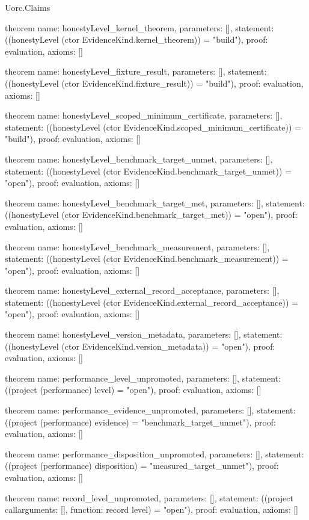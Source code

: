 \begin{lexlean}{Uorc.Claims}
\begin{semanticmodule}
theorem{
  name: honestyLevel_kernel_theorem,
  parameters: [],
  statement: ((honestyLevel (ctor EvidenceKind.kernel_theorem)) = "build"),
  proof: evaluation{},
  axioms: []
}

theorem{
  name: honestyLevel_fixture_result,
  parameters: [],
  statement: ((honestyLevel (ctor EvidenceKind.fixture_result)) = "build"),
  proof: evaluation{},
  axioms: []
}

theorem{
  name: honestyLevel_scoped_minimum_certificate,
  parameters: [],
  statement: ((honestyLevel (ctor EvidenceKind.scoped_minimum_certificate)) = "build"),
  proof: evaluation{},
  axioms: []
}

theorem{
  name: honestyLevel_benchmark_target_unmet,
  parameters: [],
  statement: ((honestyLevel (ctor EvidenceKind.benchmark_target_unmet)) = "open"),
  proof: evaluation{},
  axioms: []
}

theorem{
  name: honestyLevel_benchmark_target_met,
  parameters: [],
  statement: ((honestyLevel (ctor EvidenceKind.benchmark_target_met)) = "open"),
  proof: evaluation{},
  axioms: []
}

theorem{
  name: honestyLevel_benchmark_measurement,
  parameters: [],
  statement: ((honestyLevel (ctor EvidenceKind.benchmark_measurement)) = "open"),
  proof: evaluation{},
  axioms: []
}

theorem{
  name: honestyLevel_external_record_acceptance,
  parameters: [],
  statement: ((honestyLevel (ctor EvidenceKind.external_record_acceptance)) = "open"),
  proof: evaluation{},
  axioms: []
}

theorem{
  name: honestyLevel_version_metadata,
  parameters: [],
  statement: ((honestyLevel (ctor EvidenceKind.version_metadata)) = "open"),
  proof: evaluation{},
  axioms: []
}

theorem{
  name: performance_level_unpromoted,
  parameters: [],
  statement: ((project (performance) level) = "open"),
  proof: evaluation{},
  axioms: []
}

theorem{
  name: performance_evidence_unpromoted,
  parameters: [],
  statement: ((project (performance) evidence) = "benchmark_target_unmet"),
  proof: evaluation{},
  axioms: []
}

theorem{
  name: performance_disposition_unpromoted,
  parameters: [],
  statement: ((project (performance) disposition) = "measured_target_unmet"),
  proof: evaluation{},
  axioms: []
}

theorem{
  name: record_level_unpromoted,
  parameters: [],
  statement: ((project call{arguments: [], function: record} level) = "open"),
  proof: evaluation{},
  axioms: []
}


\end{semanticmodule}
\end{lexlean}
